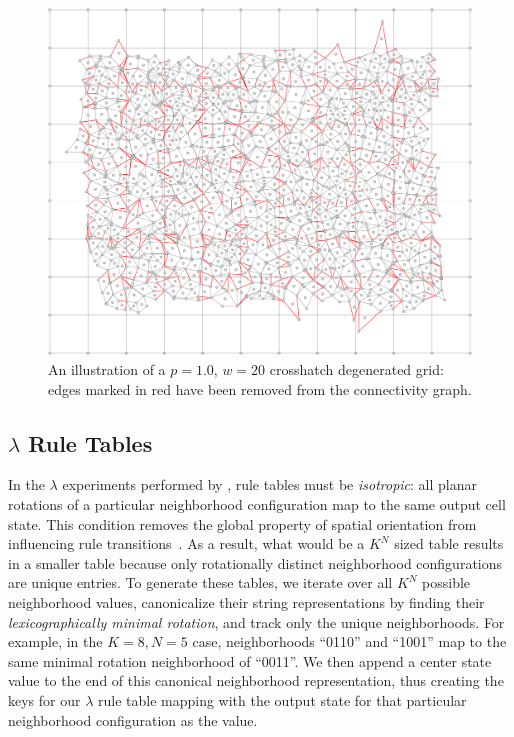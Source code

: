 \documentclass[a4paper,11pt]{article}
\begin{document}
\begin{figure}[htp]
\centering
\includegraphics[width=1.0\textwidth]{ch3_figs/ch_p100_w20}
\caption[Crosshatching Degeneration]{
	An illustration of a $p=1.0$, $w=20$ crosshatch degenerated grid: edges marked in red have been removed from the connectivity graph.
}
\label{fig:crosshatch_degen}
\end{figure}

\subsection{$\lambda$ Rule Tables}
\label{subsec:ch3_lamb}
In the $\lambda$ experiments performed by \citeauthor{wo90}, rule tables must be \textit{isotropic}: all planar rotations of a particular neighborhood configuration map to the same output cell state. This condition removes the global property of spatial orientation from influencing rule transitions~\cite{av00,wo90}. As a result, what would be a $K^N$ sized table results in a smaller table because only rotationally distinct neighborhood configurations are unique entries. To generate these tables, we iterate over all $K^N$ possible neighborhood values, canonicalize their string representations by finding their \textit{lexicographically minimal rotation}, and track only the unique neighborhoods. For example, in the $K=8, N=5$ case, neighborhoods ``0110'' and ``1001'' map to the same minimal rotation neighborhood of ``0011''. We then append a center state value to the end of this canonical neighborhood representation, thus creating the keys for our $\lambda$ rule table mapping with the output state for that particular neighborhood configuration as the value.
\end{document}
